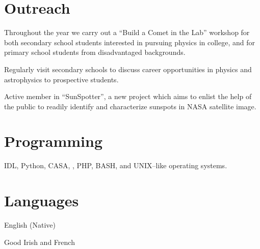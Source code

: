 \documentclass[margin,line]{resume}
\begin{document}
\begin{resume}
    \vspace{0mm}
    \section{\mysidestyle Outreach}

	\begin{list2}
    \item Throughout the year we carry out a ``Build a Comet in the Lab'' workshop for both secondary school students interested in pursuing physics in college, and for primary school students from disadvantaged backgrounds.
    \item Regularly visit secondary schools to discuss career opportunities in physics and astrophysics to prospective students.
        \item Active member in ``SunSpotter'', a new project which aims to enlist the help of the public to readily identify and characterize sunspots in NASA satellite image.\vspace{-1mm}\\%
    \end{list2}


    \vspace{0mm}
    \section{\mysidestyle Programming} 

    IDL, Python, CASA, \LaTeXe, PHP, BASH, and UNIX--like operating systems.

    \vspace{0mm}
    \section{\mysidestyle Languages} 
	\begin{list2}
    \item English (Native)
    \item Good Irish and French
    \end{list2}


    \vspace{0mm}

\end{resume}
\end{document}
